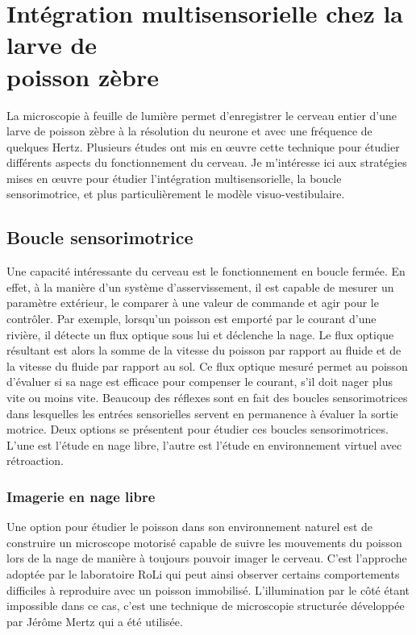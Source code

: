 \section[Intégration multisensorielle]{Intégration multisensorielle chez la larve de \\ poisson zèbre}

La microscopie à feuille de lumière permet d'enregistrer le cerveau entier d'une larve de poisson zèbre à la résolution du neurone et avec une fréquence de quelques Hertz. Plusieurs études ont mis en œuvre cette technique pour étudier différents aspects du fonctionnement du cerveau. Je m'intéresse ici aux stratégies mises en œuvre pour étudier l'intégration multisensorielle, la boucle sensorimotrice, et plus particulièrement le modèle visuo-vestibulaire.


\subsection{Boucle sensorimotrice}

Une capacité intéressante du cerveau est le fonctionnement en boucle fermée. En effet, à la manière d'un système d'asservissement, il est capable de mesurer un paramètre extérieur, le comparer à une valeur de commande et agir pour le contrôler. Par exemple, lorsqu'un poisson est emporté par le courant d'une rivière, il détecte un flux optique sous lui et déclenche la nage. Le flux optique résultant est alors la somme de la vitesse du poisson par rapport au fluide et de la vitesse du fluide par rapport au sol. Ce flux optique mesuré permet au poisson d'évaluer si sa nage est efficace pour compenser le courant, s'il doit nager plus vite ou moins vite. Beaucoup des réflexes sont en fait des boucles sensorimotrices dans lesquelles les entrées sensorielles servent en permanence à évaluer la sortie motrice. Deux options se présentent pour étudier ces boucles sensorimotrices. L'une est l'étude en nage libre, l'autre est l'étude en environnement virtuel avec rétroaction.

\subsubsection{Imagerie en nage libre}

Une option pour étudier le poisson dans son environnement naturel est de construire un microscope motorisé capable de suivre les mouvements du poisson lors de la nage de manière à toujours pouvoir imager le cerveau. C'est l'approche adoptée par le laboratoire RoLi \cite{kim_pan-neuronal_2017} qui peut ainsi observer certains comportements difficiles à reproduire avec un poisson immobilisé. L'illumination par le côté étant impossible dans ce cas, c'est une technique de microscopie structurée développée par Jérôme Mertz \cite{mertz_optical_2011} qui a été utilisée.

